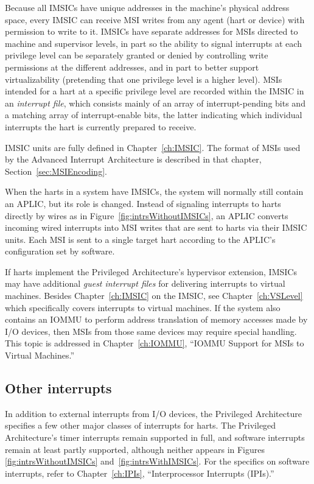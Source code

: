 Because all IMSICs have unique addresses in the machine's physical
address space, every IMSIC can receive MSI writes from any agent (hart
or device) with permission to write to it.
IMSICs have separate addresses for MSIs directed to machine and
supervisor levels, in part so the ability to signal interrupts at each
privilege level can be separately granted or denied by controlling
write permissions at the different addresses, and in part to better
support virtualizability (pretending that one privilege level is a
higher level).
MSIs intended for a hart at a specific privilege level are recorded
within the IMSIC in an \emph{interrupt file}, which consists mainly
of an array of interrupt-pending bits and a matching array of
interrupt-enable bits, the latter indicating which individual
interrupts the hart is currently prepared to receive.

IMSIC units are fully defined in Chapter~\ref{ch:IMSIC}.
The format of MSIs used by the {\RISCV} Advanced Interrupt Architecture
is described in that chapter, Section~\ref{sec:MSIEncoding}.

When the harts in a {\RISCV} system have IMSICs, the system will
normally still contain an APLIC, but its role is changed.
Instead of signaling interrupts to harts directly by wires as in
Figure~\ref{fig:intrsWithoutIMSICs}, an APLIC converts incoming
wired interrupts into MSI writes that are sent to harts via their IMSIC
units.
Each MSI is sent to a single target hart according to the APLIC's
configuration set by software.

If {\RISCV} harts implement the Privileged Architecture's hypervisor
extension, IMSICs may have additional \emph{guest interrupt files} for
delivering interrupts to virtual machines.
Besides Chapter~\ref{ch:IMSIC} on the IMSIC, see
Chapter~\ref{ch:VSLevel} which specifically covers interrupts to
virtual machines.
If the system also contains an \mbox{IOMMU} to perform address translation
of memory accesses made by I/O devices, then MSIs from those same
devices may require special handling.
This topic is addressed in Chapter~\ref{ch:IOMMU}, ``\mbox{IOMMU} Support
for MSIs to Virtual Machines.''

\subsection{Other interrupts}

In addition to external interrupts from I/O devices, the {\RISCV}
Privileged Architecture specifies a few other major classes of
interrupts for harts.
The Privileged Architecture's timer interrupts remain supported
in full, and software interrupts remain at least partly supported,
although neither appears in Figures \ref{fig:intrsWithoutIMSICs}
and~\ref{fig:intrsWithIMSICs}.
For the specifics on software interrupts, refer to
Chapter~\ref{ch:IPIs}, ``Interprocessor Interrupts (IPIs).''

